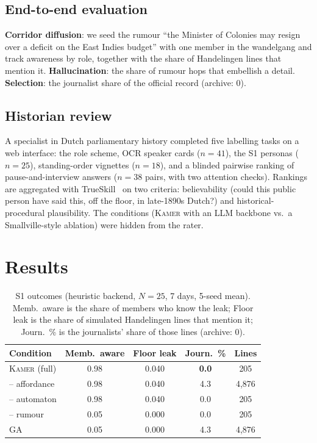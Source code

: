 \documentclass[sigconf,review,anonymous]{acmart}
\newcommand{\sys}{\textsc{Kamer}}
\begin{document}
\subsection{End-to-end evaluation}
\label{sec:eval-e2e}
\textbf{Corridor diffusion}: we seed the rumour ``the Minister of Colonies
may resign over a deficit on the East Indies budget'' with one member in
the wandelgang and track awareness by role, together with the share of
Handelingen lines that mention it. \textbf{Hallucination}: the share of
rumour hops that embellish a detail. \textbf{Selection}: the journalist
share of the official record (archive: $0$).

\subsection{Historian review}
\label{sec:eval-interview}
A specialist in Dutch parliamentary history completed five labelling tasks
on a web interface: the role scheme, OCR speaker cards ($n{=}41$), the S1
personas ($n{=}25$), standing-order vignettes ($n{=}18$), and a blinded
pairwise ranking of pause-and-interview answers ($n{=}38$ pairs, with two
attention checks). Rankings are aggregated with
TrueSkill~\cite{herbrich2006trueskill} on two criteria: believability
(could this public person have said this, off the floor, in late-1890s
Dutch?) and historical-procedural plausibility. The conditions (\sys{} with
an LLM backbone vs.\ a Smallville-style ablation) were hidden from the
rater.

\section{Results}
\label{sec:results}

\begin{table}[t]
\caption{S1 outcomes (heuristic backend, $N{=}25$, 7 days, 5-seed mean).
Memb.\ aware is the share of members who know the leak; Floor leak is the
share of simulated Handelingen lines that mention it; Journ.\ \% is the
journalists' share of those lines (archive: $0$).}
\label{tab:interview}
\centering\small
\setlength{\tabcolsep}{3.5pt}
\begin{tabular}{lcccc}
\toprule
Condition & Memb.\ aware & Floor leak & Journ.\ \% & Lines \\
\midrule
\sys{} (full) & 0.98 & 0.040 & \textbf{0.0} & 205 \\
\quad -- affordance & 0.98 & 0.040 & 4.3 & 4{,}876 \\
\quad -- automaton & 0.98 & 0.040 & 0.0 & 205 \\
\quad -- rumour & 0.05 & 0.000 & 0.0 & 205 \\
GA~\cite{park2023generative} & 0.05 & 0.000 & 4.3 & 4{,}876 \\
\bottomrule
\end{tabular}
\end{table}
\end{document}
